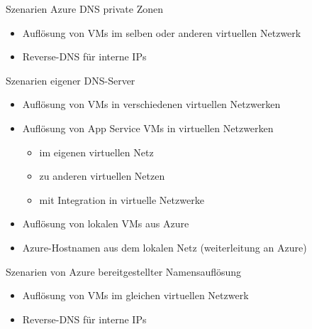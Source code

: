 \begin{flashcard}[]{Szenarien Azure DNS private Zonen}
  \begin{itemize}
    \item Auflösung von VMs im selben oder anderen virtuellen Netzwerk
    \item Reverse-DNS für interne IPs
  \end{itemize}
\end{flashcard}

\begin{flashcard}[]{Szenarien eigener DNS-Server}
  \begin{itemize}
    \item Auflösung von VMs in verschiedenen virtuellen Netzwerken
    \item Auflösung von App Service VMs in virtuellen Netzwerken
      \begin{itemize}
        \item im eigenen virtuellen Netz
        \item zu anderen virtuellen Netzen
        \item mit Integration in virtuelle Netzwerke
      \end{itemize}
    \item Auflösung von lokalen VMs aus Azure
    \item Azure-Hostnamen aus dem lokalen Netz\newline
      (weiterleitung an Azure)
  \end{itemize}
\end{flashcard}

\begin{flashcard}[]{Szenarien von Azure bereitgestellter Namensauflösung}
  \begin{itemize}
    \item Auflösung von VMs im gleichen virtuellen Netzwerk
    \item Reverse-DNS für interne IPs
  \end{itemize}
\end{flashcard}

